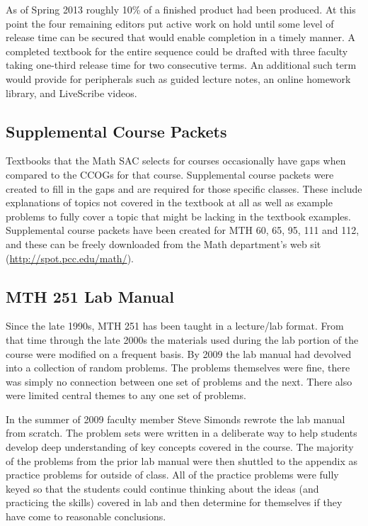 As of Spring 2013 roughly 10\% of a finished product had been produced.  At this point the four remaining editors put active work on hold until some level of release time can be secured that would enable completion in a timely manner.  A completed textbook for the entire sequence could be drafted with three faculty taking one-third release time for two consecutive terms.  An additional such term would provide for peripherals such as guided lecture notes, an online homework library, and LiveScribe videos.
 
\subsection{Supplemental Course Packets}
Textbooks that the Math SAC selects for courses occasionally have gaps when compared to the CCOGs for that course.  Supplemental course packets were created to fill in the gaps and are required for those specific classes.  These include explanations of topics not covered in the textbook at all as well as example problems to fully cover a topic that might be lacking in the textbook examples.  Supplemental course packets have been created for MTH 60, 65, 95, 111 and 112, and these can be freely downloaded from the Math department's web sit (\href{http://spot.pcc.edu/math/}{http://spot.pcc.edu/math/}).
 
\subsection{MTH 251 Lab Manual}
Since the late 1990s, MTH 251 has been taught in a lecture/lab format.  From that time through the late 2000s the materials used during the lab portion of the course were modified on a frequent basis.  By 2009 the lab manual had devolved into a collection of random problems.  The problems themselves were fine, there was simply no connection between one set of problems and the next.  There also were limited central themes to any one set of problems.

In the summer of 2009 faculty member Steve Simonds rewrote the lab manual from scratch.  The problem sets were written in a deliberate way to help students develop deep understanding of key concepts covered in the course.  The majority of the problems from the prior lab manual were then shuttled to the appendix as practice problems for outside of class.  All of the practice problems were fully keyed so that the students could continue thinking about the ideas (and practicing the skills) covered in lab and then determine for themselves if they have come to reasonable conclusions.

